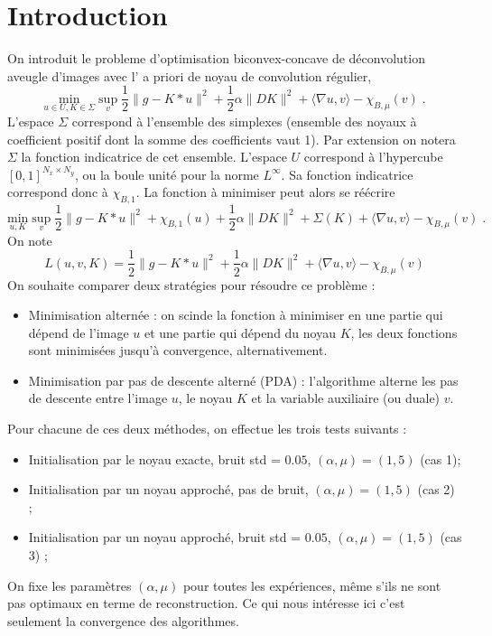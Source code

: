 \documentclass[a4paper]{article}
\begin{document}
\section*{Introduction}
On introduit le probleme d'optimisation biconvex-concave
de déconvolution aveugle d'images 
avec l' a priori de noyau de convolution régulier,
\[
\underset{u \in U ,K \in \Sigma}{\text{min}} \; \underset{v}{\text{sup}} \;
\frac{1}{2} \| g - K * u\|^2 
+ \frac{1}{2} \alpha \| D K \|^2
+ \langle \nabla u , v \rangle
- \chi_{B,\mu}(v)
\; .
\]
L'espace $\Sigma$ correspond à l'ensemble des simplexes 
(ensemble des noyaux à coefficient positif dont la somme des coefficients vaut 1).
Par extension on notera $\Sigma$ la fonction indicatrice de cet ensemble.
L'espace $U$ correspond à l'hypercube $[0,1]^{N_x \times N_y}$, ou la boule unité pour la norme $L^\infty$.
Sa fonction indicatrice correspond donc à $\chi_{B,1}$.
La fonction à minimiser peut alors se réécrire
\[
\underset{u ,K }{\text{min}} \; \underset{v}{\text{sup}} \;
\frac{1}{2} \| g - K * u\|^2 
+ \chi_{B,1} (u)
+ \frac{1}{2} \alpha \| D K \|^2
+ \Sigma(K)
+\langle \nabla u , v \rangle
- \chi_{B,\mu}(v)
\; .
\]
On note
\[
L(u,v,K)
 =\frac{1}{2} \| g - K * u\|^2 
+ \frac{1}{2} \alpha \| D K \|^2
+ \langle \nabla u , v \rangle
- \chi_{B,\mu}(v)
\]
On souhaite comparer deux stratégies pour résoudre ce problème :
\begin{itemize}
    \item Minimisation alternée : on scinde la fonction à minimiser en une partie qui dépend de l'image $u$ 
    et une partie qui dépend du noyau $K$, les deux fonctions sont minimisées jusqu'à convergence, alternativement.
    \item Minimisation par pas de descente alterné (PDA) : l'algorithme alterne les pas de descente entre l'image $u$, le noyau $K$ et la variable auxiliaire (ou duale) $v$.
\end{itemize}
Pour chacune de ces deux méthodes, on effectue les trois tests suivants :
\begin{itemize}
     \item Initialisation par le noyau exacte, bruit std = $0.05$, $(\alpha,\mu) = (1,5)$  (cas 1);
     \item Initialisation par un noyau approché, pas de bruit, $(\alpha,\mu) = (1,5)$  (cas 2) ;
      \item Initialisation par un noyau approché, bruit std = $0.05$, $(\alpha,\mu) = (1,5)$  (cas 3) ;
\end{itemize}
On fixe les paramètres $(\alpha,\mu)$ pour toutes les expériences, même s'ils ne sont pas optimaux en terme de reconstruction. 
Ce qui nous intéresse ici c'est seulement la convergence des algorithmes.
\end{document}
